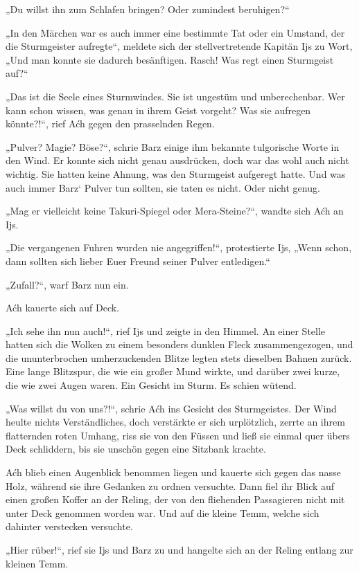 „Du willst ihn zum Schlafen bringen? Oder zumindest beruhigen?“

„In den Märchen war es auch immer eine bestimmte Tat oder ein Umstand, der die Sturmgeister aufregte“, meldete sich der stellvertretende Kapitän Ijs zu Wort, „Und man konnte sie dadurch besänftigen. Rasch! Was regt einen Sturmgeist auf?“

„Das ist die Seele eines Sturmwindes. Sie ist ungestüm und unberechenbar. Wer kann schon wissen, was genau in ihrem Geist vorgeht? Was sie aufregen könnte?!“, rief Aćh gegen den prasselnden Regen.

„Pulver? Magie? Böse?“, schrie Barz einige ihm bekannte tulgorische Worte in den Wind. Er konnte sich nicht genau ausdrücken, doch war das wohl auch nicht wichtig. Sie hatten keine Ahnung, was den Sturmgeist aufgeregt hatte. Und was auch immer Barz‘ Pulver tun sollten, sie taten es nicht. Oder nicht genug.

„Mag er vielleicht keine Takuri-Spiegel oder Mera-Steine?“, wandte sich Aćh an Ijs.

„Die vergangenen Fuhren wurden nie angegriffen!“, protestierte Ijs, „Wenn schon, dann sollten sich lieber Euer Freund seiner Pulver entledigen.“

„Zufall?“, warf Barz nun ein.

Aćh kauerte sich auf Deck.

„Ich sehe ihn nun auch!“, rief Ijs und zeigte in den Himmel. An einer Stelle hatten sich die Wolken zu einem besonders dunklen Fleck zusammengezogen, und die ununterbrochen umherzuckenden Blitze legten stets dieselben Bahnen zurück. Eine lange Blitzspur, die wie ein großer Mund wirkte, und darüber zwei kurze, die wie zwei Augen waren. Ein Gesicht im Sturm. Es schien wütend.

„Was willst du von uns?!“, schrie Aćh ins Gesicht des Sturmgeistes. Der Wind heulte nichts Verständliches, doch verstärkte er sich urplötzlich, zerrte an ihrem flatternden roten Umhang, riss sie von den Füssen und ließ sie einmal quer übers Deck schliddern, bis sie unschön gegen eine Sitzbank krachte.

Aćh blieb einen Augenblick benommen liegen und kauerte sich gegen das nasse Holz, während sie ihre Gedanken zu ordnen versuchte. Dann fiel ihr Blick auf einen großen Koffer an der Reling, der von den fliehenden Passagieren nicht mit unter Deck genommen worden war. Und auf die kleine Temm, welche sich dahinter verstecken versuchte.

„Hier rüber!“, rief sie Ijs und Barz zu und hangelte sich an der Reling entlang zur kleinen Temm.


